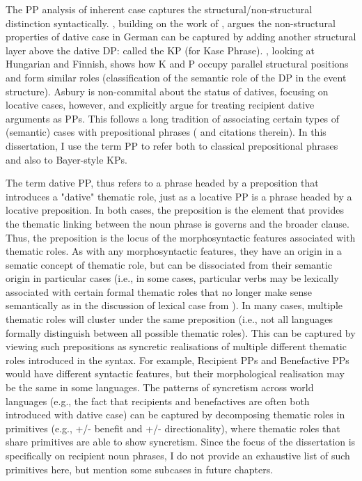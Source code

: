 The PP analysis of inherent case captures the structural/non-structural distinction syntactically. \cite{Bayer.2001}, building on the work of \cite{Bittner.1996}, argues the non-structural properties of dative case in German can be captured by adding another structural layer above the dative DP: called the KP (for Kase Phrase). \cite{Asbury.2005,Asbury.2007}, looking at Hungarian and Finnish, shows how K and P occupy parallel structural positions and form similar roles (classification of the semantic role of the DP in the event structure). Asbury is non-commital about the status of datives, focusing on locative cases, however, \cite{Rezac.2008} and \cite{Caha.2009} explicitly argue for treating recipient dative arguments as PPs. This follows a long tradition of associating certain types of (semantic) cases with prepositional phrases (\citealt{McFadden.2004} and citations therein). In this dissertation, I use the term PP to refer both to classical prepositional phrases and also to Bayer-style KPs.

The term dative PP, thus refers to a phrase headed by a preposition that introduces a "dative" thematic role, just as a locative PP is a phrase headed by a locative preposition. In both cases, the preposition is the element that provides the thematic linking between the noun phrase is governs and the broader clause. Thus, the preposition is the locus of the morphosyntactic features associated with thematic roles. As with any morphosyntactic features, they have an origin in a sematic concept of thematic role, but can be dissociated from their semantic origin in particular cases (i.e., in some cases, particular verbs may be lexically associated with certain formal thematic roles that no longer make sense semantically as in the discussion of lexical case from \cite{Woolford.2006}). In many cases, multiple thematic roles will cluster under the same preposition (i.e., not all languages formally distinguish between all possible thematic roles). This can be captured by viewing such prepositions as syncretic realisations of multiple different thematic roles introduced in the syntax. For example, Recipient PPs and Benefactive PPs would have different syntactic features, but their morphological realisation may be the same in some languages. The patterns of syncretism across world languages (e.g., the fact that recipients and benefactives are often both introduced with dative case) can be captured by decomposing thematic roles in primitives (e.g., +/- benefit and +/- directionality), where thematic roles that share primitives are able to show syncretism. Since the focus of the dissertation is specifically on recipient noun phrases, I do not provide an exhaustive list of such primitives here, but mention some subcases in future chapters.

